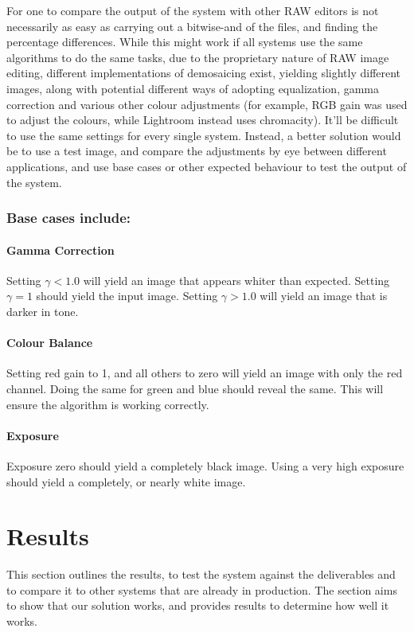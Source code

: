 \documentclass[10pt,a4paper]{article}
\begin{document}
For one to compare the output of the system with other RAW editors is not necessarily as easy as carrying out a bitwise-and  of the files, and finding the percentage
differences. While this might work if all systems use the same algorithms to do the same tasks, due to the proprietary nature of RAW image editing,
different implementations of demosaicing exist, yielding slightly different images, along with potential different ways of adopting equalization,
gamma correction and various other colour adjustments (for example, RGB gain was used to adjust the colours, while Lightroom instead uses chromacity).
It'll be difficult to use the same settings for every single system. Instead, a better solution would be to use a test image, and compare the adjustments
by eye between different applications, and use base cases or other expected behaviour to test the output of the system.

\subsubsection{Base cases include:}
\paragraph{Gamma Correction}
Setting $\gamma < 1.0$ will yield an image that appears whiter than expected. Setting $\gamma = 1$ should yield the input image.
Setting $\gamma > 1.0$ will yield an image that is darker in tone. 

\paragraph{Colour Balance}
Setting red gain to 1, and all others to zero will yield an image with only the red channel. Doing the same for green and blue should reveal the same.
This will ensure the algorithm is working correctly.

\paragraph{Exposure}
Exposure zero should yield a completely black image. Using a very high exposure should yield a completely, or nearly white image.

\section{Results}
This section outlines the results, to test the system against the deliverables and to compare it to other systems that are already in production.
The section aims to show that our solution works, and provides results to determine how well it works.
\end{document}
